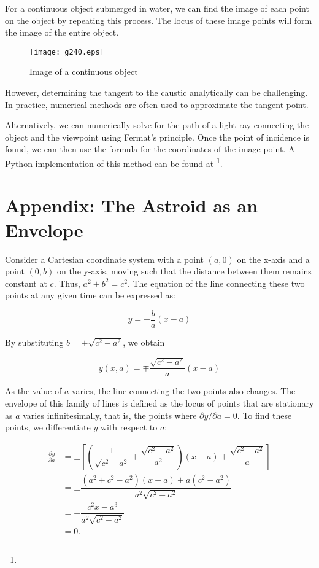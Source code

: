 \documentclass[twocolumn]{article}
\begin{document}
For a continuous object submerged in water, we can find the image of each point on the object by repeating this process. The locus of these image points will form the image of the entire object.

\begin{figure}[h]
	\centering
	\texttt{[image: g240.eps]}
	\caption{Image of a continuous object}
	\label{fig:extended_image}
\end{figure}

However, determining the tangent to the caustic analytically can be challenging. In practice, numerical methods are often used to approximate the tangent point.

Alternatively, we can numerically solve for the path of a light ray connecting the object and the viewpoint using Fermat's principle. Once the point of incidence is found, we can then use the formula for the coordinates of the image point. A Python implementation of this method can be found at  \href{https://github.com/mingshey/python_projects/blob/main/Refraction_Image_en.ipynb}{}\footnote{}.

\appendix
\newcommand{\pd}[2]{{\frac{\partial #1}{\partial #2}}}
\newcommand{\ilpd}[2]{{{\partial #1}/{\partial #2}}}
\section*{Appendix: The Astroid as an Envelope}

Consider a Cartesian coordinate system with a point $(a, 0)$ on the x-axis and a point $(0, b)$ on the y-axis, moving such that the distance between them remains constant at $c$. Thus, $a^2+b^2=c^2$. The equation of the line connecting these two points at any given time can be expressed as:

$$y=-\dfrac{b}{a}(x-a)$$

By substituting $b=\pm \sqrt{c^2-a^2}$, we obtain

$$y(x, a) = \mp \dfrac{\sqrt{c^2-a^2}}{a}(x-a)$$

As the value of $a$ varies, the line connecting the two points also changes. The envelope of this family of lines is defined as the locus of points that are stationary as $a$ varies infinitesimally, that is, the points where $\ilpd{y}{a} = 0$. To find these points, we differentiate $y$ with respect to $a$:

$$ \begin{aligned}
	\pd{y}{a} &= \pm\left[\left( \dfrac{1}{\sqrt{c^2-a^2}}+\dfrac{\sqrt{c^2-a^2}}{a^2}\right) (x-a) + \dfrac{\sqrt{c^2-a^2}}{a} \right]\\
	&= \pm \dfrac{(a^2+c^2-a^2)(x-a)+a(c^2-a^2)}{a^2\sqrt{c^2-a^2}}\\
	&= \pm \dfrac{c^2 x - a^3}{a^2 \sqrt{c^2 - a^2}}\\
	&= 0.
\end{aligned}
$$
\end{document}
